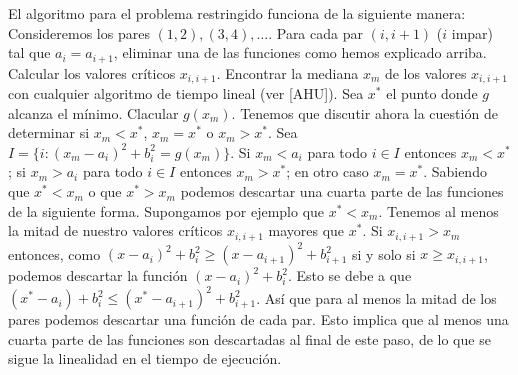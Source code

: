 \documentclass[twoside]{article}
\begin{document}
\begin{solucion}
El algoritmo para el problema restringido funciona de la siguiente manera: Consideremos los pares $(1,2),(3,4),\dots$. Para cada par $(i,i+1)$ ($i$ impar) tal que $a_i=a_{i+1}$, eliminar una de las funciones como hemos explicado arriba. Calcular los valores críticos $x_{i,i+1}$. Encontrar la mediana $x_m$ de los valores $x_{i,i+1}$ con cualquier algoritmo de tiempo lineal (ver [AHU]). Sea $x^*$ el punto donde $g$ alcanza el mínimo. Clacular $g(x_m)$. Tenemos que discutir ahora la cuestión de determinar si $x_m<x^*$, $x_m=x^*$ o $x_m>x^*$. Sea $I=\{i:(x_m-a_i)^2+b_i^2=g(x_m)\}$. Si $x_m<a_i$ para todo $i\in I$ entonces $x_m<x^*$; si $x_m>a_i$ para todo $i\in I$ entonces $x_m>x^*$; en otro caso $x_m=x^*$. Sabiendo que $x^*<x_m$ o que $x^*>x_m$ podemos descartar una cuarta parte de las funciones de la siguiente forma. Supongamos por ejemplo que $x^*<x_m$. Tenemos al menos la mitad de nuestro valores críticos $x_{i,i+1}$ mayores que $x^*$. Si $x_{i,i+1}>x_m$ entonces, como $(x-a_i)^2+b_i^2\geq (x-a_{i+1})^2+b_{i+1}^2$ si y solo si $x\geq x_{i,i+1}$, podemos descartar la función $(x-a_i)^2+b_i^2$. Esto se debe a que $(x^*-a_i)+b_i^2\leq (x^*-a_{i+1})^2+b_{i+1}^2$. Así que para al menos la mitad de los pares podemos descartar una función de cada par. Esto implica que al menos una cuarta parte de las funciones son descartadas al final de este paso, de lo que se sigue la linealidad en el tiempo de ejecución.\\


\end{solucion}
\end{document}
